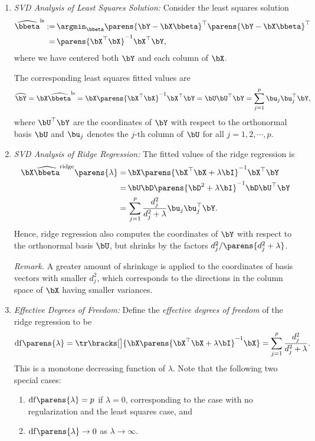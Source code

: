 \documentclass[12pt]{article}
\begin{document}
\begin{enumerate}[label=\textbf{\arabic*.}]
\begin{enumerate}
		\item \textit{SVD Analysis of Least Squares Solution:} Consider the least squares solution 
		\begin{align*}
			\widehat{\bbeta}^{\mathrm{ls}} := & \, \argmin_{\bbeta} \parens{\bY - \bX \bbeta}^{\top} \parens{\bY - \bX \bbeta}^{\top} \\ 
			= & \, \parens{\bX^\top \bX}^{-1} \bX^\top \bY, 
		\end{align*}
		where we have centered both $\bY$ and each column of $\bX$. 
		
		The corresponding least squares fitted values are 
		\begin{align*}
			\widehat{\bY} = \bX \widehat{\bbeta}^{\mathrm{ls}} = \bX \parens{\bX^\top \bX}^{-1} \bX^\top \bY = \bU \bU^\top \bY = \sum_{j=1}^p \bu_j \bu_j^\top \bY, 
		\end{align*}
		where $\bU^\top \bY$ are the coordinates of $\bY$ with respect to the orthonormal basis $\bU$ and $\bu_j$ denotes the $j$-th column of $\bU$ for all $j = 1, 2, \cdots, p$. 
		
		\item \textit{SVD Analysis of Ridge Regression:} The fitted values of the ridge regression is 
		\begin{align*}
			\bX \widehat{\bbeta}^{\mathrm{ridge}} \parens{\lambda} = & \, \bX \parens{\bX^\top \bX + \lambda \bI}^{-1} \bX^\top \bY \\ 
			= & \, \bU \bD \parens{\bD^2 + \lambda \bI}^{-1} \bD \bU ^\top \bY \\ 
			= & \, \sum_{j=1}^p \frac{d_j^2}{d_j^2 + \lambda} \bu_j \bu_j^\top \bY. 
		\end{align*}
		Hence, ridge regression also computes the coordinates of $\bY$ with respect to the orthonormal basis $\bU$, but shrinks by the factors $d_j^2 / \parens{d_j^2 + \lambda}$. 
		
		\textit{Remark.} A greater amount of shrinkage is applied to the coordinates of basis vectors with smaller $d_j^2$, which corresponds to the directions in the column space of $\bX$ having smaller variances. 
		
		\item \textit{Effective Degrees of Freedom:} Define the \textit{effective degrees of freedom} of the ridge regression to be 
		\begin{align*}
			\mathrm{df} \parens{\lambda} = \tr \bracks[\big]{\bX \parens{\bX^\top \bX + \lambda \bI}^{-1} \bX} = \sum_{j=1}^p \frac{d_j^2}{d_j^2 + \lambda}. 
		\end{align*}
		This is a monotone decreasing function of $\lambda$. Note that the following two special cases: 
		\begin{enumerate}
			\item $\mathrm{df} \parens{\lambda} = p$ if $\lambda = 0$, corresponding to the case with no regularization and the least squares case, and 
			\item $\mathrm{df} \parens{\lambda} \to 0$ as $\lambda \to \infty$. 
		\end{enumerate}
		

\end{enumerate}
\end{enumerate}
\end{document}
